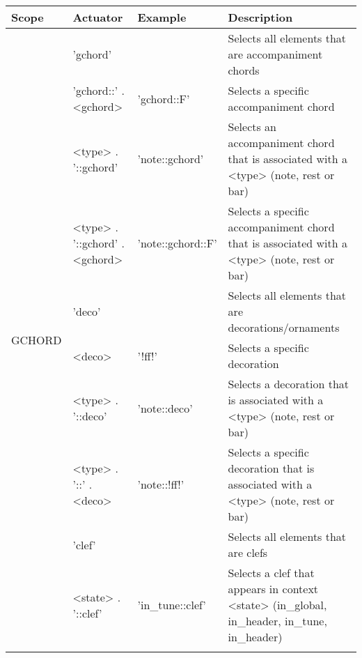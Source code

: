 \begin{center}
  \begin{tabular}{|p{1.75cm}|p{3.5cm}|p{3cm}|p{7cm}|}
    \hline
    Scope & Actuator & Example & Description \\
    \hline
    \hline
    \multirow{11}{*}{GCHORD}
    & 'gchord'
    &
    & Selects all \abc{} elements that are accompaniment chords
    \\ \cline{2-4}

    & 'gchord::' . <gchord>
    & 'gchord::F'
    & Selects a specific accompaniment chord
    \\ \cline{2-4}

    & <type> . '::gchord'
    & 'note::gchord'
    & Selects an accompaniment chord that is associated with a <type> (note, rest or bar)
    \\ \cline{2-4}

    & <type> . '::gchord' . <gchord>
    & 'note::gchord::F'
    & Selects a specific accompaniment chord that is associated with a <type> (note, rest or bar)
    \\ \cline{2-4}
    \hline

    \hline
    \multirow{9}{*}{DECO}
    & 'deco'
    &
    & Selects all \abc{} elements that are decorations/ornaments
    \\ \cline{2-4}

    & <deco>
    & '!ff!'
    & Selects a specific decoration
    \\ \cline{2-4}

    & <type> . '::deco'
    & 'note::deco'
    & Selects a decoration that is associated with a <type> (note, rest or bar)
    \\ \cline{2-4}

    & <type> . '::' . <deco>
    &  'note::!ff!'
    & Selects a specific decoration that is associated with a <type> (note, rest or bar)
    \\ \cline{2-4}
    \hline

    \hline
    \multirow{5}{*}{CLEF}
    & 'clef'
    &
    & Selects all \abc{} elements that are clefs
    \\ \cline{2-4}

    & <state> . '::clef'
    & 'in\_tune::clef'
    & Selects a clef that appears in context <state> (in\_global, in\_header, in\_tune, in\_header)
    \\ \cline{2-4}
    \hline

  \end{tabular}
\end{center}


